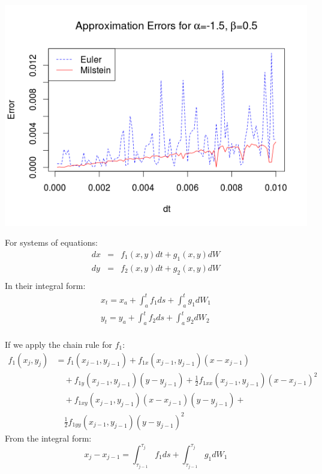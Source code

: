 \begin{frame}
	\begin{center}
	\includegraphics[scale=0.55]{alpham15_beta05.png} 
	\end{center}
\end{frame}

\begin{frame}
For systems of equations:
	\begin{eqnarray*}
		dx&=&f_1(x,y)dt+g_1(x,y)dW\\
		dy&=&f_2(x,y)dt+g_2(x,y)dW\\
	\end{eqnarray*}
In their integral form:
	\begin{eqnarray*}
		x_t=x_a+\int_{a}^{t}f_1 ds+\int_{a}^{t}g_1dW_1\\
		y_t=y_a+\int_{a}^{t}f_2 ds+\int_{a}^{t}g_2dW_2\\
	\end{eqnarray*}	
\end{frame}


\begin{frame}
If we apply the chain rule for $f_1$:
	\begin{equation*}
	\begin{split}
	f_1(x_j,y_j) &=f_1(x_{j-1},y_{j-1})+f_{1x}(x_{j-1},y_{j-1})(x-x_{j-1})\\
	& \quad +f_{1y}(x_{j-1},y_{j-1})(y-y_{j-1})+\frac{1}{2} f_{1xx}(x_{j-1},y_{j-1})(x-
	x_{j-1})^2\\
	& \quad +f_{1xy}(x_{j-1},y_{j-1})(x-x_{j-1})(y-y_{j-1})+\\
	& \quad \frac{1}{2}f_{1yy}(x_{j-1},y_{j-1})(y-y_{j-1})^2
	\end{split}
	\end{equation*}
From the integral form:
	\begin{equation*}
	x_j-x_{j-1}=\int_{\tau_{j-1}}^{\tau_{j}}f_1 ds+\int_{\tau_{j-1}}^{\tau_{j}}g_1dW_1
	\end{equation*}
\end{frame}


